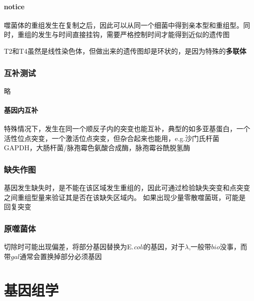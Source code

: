 \documentclass[a4paper, 12pt]{report}
\begin{document}
\subsubsection{notice}
噬菌体的重组发生在复制之后，因此可以从同一个细菌中得到亲本型和重组型。同时，重组的发生与时间直接挂钩，需要严格控制时间才能得到近似的遗传图

T2和T4虽然是线性染色体，但做出来的遗传图却是环状的，是因为特殊的\textbf{多联体}
\subsection{互补测试}
略
\subsubsection{基因内互补}
特殊情况下，发生在同一个顺反子内的突变也能互补，典型的如多亚基蛋白，一个活性位点突变，一个激活位点突变，但杂合起来也能用，e.g.沙门氏杆菌GAPDH，大肠杆菌/脉孢霉色氨酸合成酶，脉孢霉谷酰脱氢酶
\subsection{缺失作图}
基因发生缺失时，是不能在该区域发生重组的，因此可通过检验缺失突变和点突变之间重组型量来验证其是否在该缺失区域内。
如果出现少量零散噬菌斑，可能是回复突变
\subsection{原噬菌体}
切除时可能出现偏差，将部分基因替换为E.\textit{coli}的基因，对于\(\lambda\),一般带\(bio\)没事，而带\(gal\)通常会置换掉部分必须基因
\chapter{基因组学}
\end{document}
